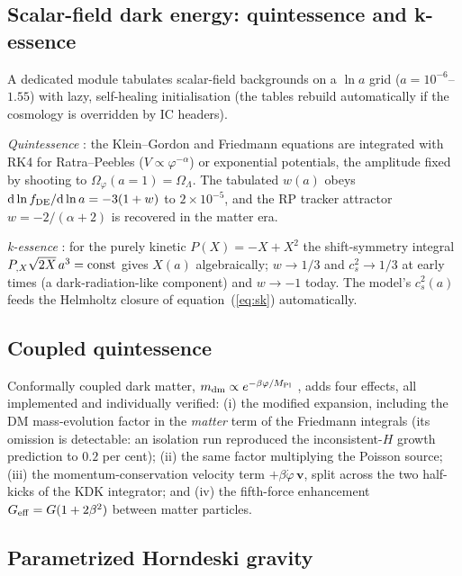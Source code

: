 \documentclass[11pt,a4paper]{article}
\newcommand{\Geff}{G_{\rm eff}}
\newcommand{\Mpl}{M_{\rm Pl}}
\begin{document}
\subsection{Scalar-field dark energy: quintessence and k-essence}
\label{sec:sde}

A dedicated module tabulates scalar-field backgrounds on a
$\ln a$ grid ($a=10^{-6}$--$1.55$) with lazy, self-healing
initialisation (the tables rebuild automatically if the cosmology
is overridden by IC headers).

\emph{Quintessence} \citep{RatraPeebles1988}: the Klein--Gordon
and Friedmann equations are integrated with RK4 for
Ratra--Peebles ($V\propto\varphi^{-\alpha}$) or exponential
potentials, the amplitude fixed by shooting to
$\Omega_\varphi(a{=}1)=\Omega_\Lambda$. The tabulated $w(a)$ obeys
${\rm d}\ln f_{\rm DE}/{\rm d}\ln a=-3(1+w)$ to $2\times10^{-5}$,
and the RP tracker attractor $w=-2/(\alpha+2)$ is recovered in the
matter era.

\emph{k-essence} \citep{ArmendarizPicon2001}: for the purely
kinetic $P(X)=-X+X^2$ the shift-symmetry integral
$P_{,X}\sqrt{2X}\,a^3={\rm const}$ gives $X(a)$ algebraically;
$w\to1/3$ and $c_s^2\to1/3$ at early times (a dark-radiation-like
component) and $w\to-1$ today. The model's $c_s^2(a)$ feeds the
Helmholtz closure of equation~(\ref{eq:sk}) automatically.

\subsection{Coupled quintessence}
\label{sec:cde}

Conformally coupled dark matter, $m_{\rm dm}\propto
e^{-\beta\varphi/\Mpl}$ \citep{Amendola2000}, adds four effects,
all implemented and individually verified: (i) the modified
expansion, including the DM mass-evolution factor in the
\emph{matter} term of the Friedmann integrals (its omission is
detectable: an isolation run reproduced the inconsistent-$H$
growth prediction to $0.2$ per cent); (ii) the same factor
multiplying the Poisson source; (iii) the momentum-conservation
velocity term $+\beta\dot\varphi\,\boldsymbol{v}$, split across the two
half-kicks of the KDK integrator; and (iv) the fifth-force
enhancement $\Geff=G(1+2\beta^2)$ between matter particles.

\subsection{Parametrized Horndeski gravity}
\end{document}
